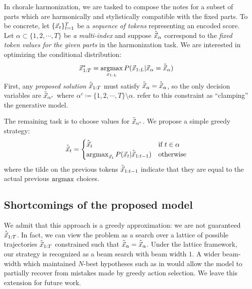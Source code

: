 In chorale harmonization, we are tasked to compose the notes for a subset of
parts which are harmonically and stylistically compatible with the fixed parts.
To be concrete, let $\{\vec{x}_{t}\}_{t=1}^T$ be a \emph{sequence of tokens}
representing an encoded score. Let $\alpha \subset \{1,2,\cdots,T\}$ be \emph{a
multi-index} and suppose $\hat{\vec{x}}_{\alpha}$ correspond to the \emph{fixed
token values for the given parts} in the harmonization task. We are interested
in optimizing the conditional distribution:
\begin{equation}
  \vec{x}_{1:T}^* = \operatorname*{argmax}_{x_{1:L}} P(\vec{x}_{1:L} | \vec{x}_{\alpha} = \hat{\vec{x}}_\alpha )
\end{equation}
First, any \emph{proposed solution} $\tilde{\vec{x}}_{1:T}$ must satisfy
$\tilde{\vec{x}}_{\alpha} = \hat{\vec{x}}_\alpha$, so the only decision variables are
$\tilde{\vec{x}}_{\alpha^c}$ where $\alpha^c \coloneqq \{1,2,\cdots,T\} \setminus
\alpha$. \citet{hinton1986learning} refer to this constraint as ``clamping''
the generative model.

The remaining task is to choose values for $\tilde{\vec{x}}_{\alpha^c}$.
We propose a simple greedy strategy:
\begin{equation}\label{eq:greedy-harmonization}
  \tilde{\vec{x}}_{t} = \begin{cases}
    \hat{\vec{x}}_{t} &\text{if}~t \in \alpha \\
    \operatorname*{argmax}_{\vec{x}_t} P(\vec{x}_t | \tilde{\vec{x}}_{1:t-1}) &\text{otherwise}
  \end{cases}
\end{equation}
where the tilde on the previous tokens $\tilde{\vec{x}}_{1:t-1}$ indicate that they are
equal to the actual previous $\operatorname*{argmax}$ choices.

\subsection{Shortcomings of the proposed model}\label{sec:shortcomings-harm}

We admit that this approach is a greedy approximation: we are not guaranteed
$\hat{\vec{x}}_{1:T}$. In fact, we can view the problem as a search over a lattice
of possible trajectories $\tilde{\vec{x}}_{1:T}$ constrained such that
$\tilde{\vec{x}}_{\alpha} = \hat{\vec{x}}_\alpha$. Under the lattice framework, our
strategy is recognized as a beam search with beam width $1$. A wider beam-width
which maintained $N$-best hypotheses such as in \citet{liu2014efficient} would
allow the model to partially recover from mistakes made by greedy action
selection. We leave this extension for future work.

